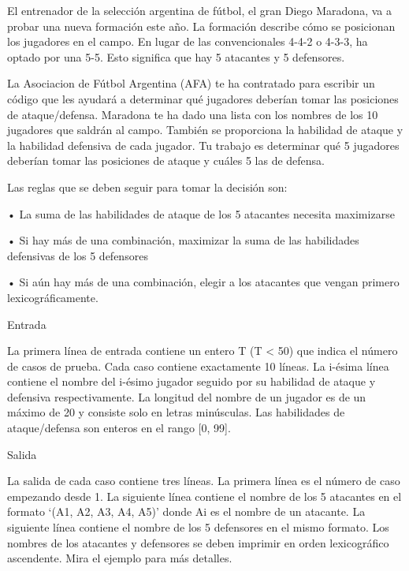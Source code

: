 El entrenador de la selección argentina de fútbol, el gran Diego Maradona, va a probar una nueva formación este año. La formación describe cómo se posicionan los jugadores en el campo. En lugar de las convencionales 4-4-2 o 4-3-3, ha optado por una 5-5. Esto significa que hay 5 atacantes y 5 defensores. 

La Asociacion de Fútbol Argentina (AFA) te ha contratado para escribir un código que les ayudará a determinar qué jugadores deberían tomar las posiciones de ataque/defensa. Maradona te ha dado una lista con los nombres de los 10 jugadores que saldrán al campo. También se proporciona la habilidad de ataque y la habilidad defensiva de cada jugador. Tu trabajo es determinar qué 5 jugadores deberían tomar las posiciones de ataque y cuáles 5 las de defensa. 

Las reglas que se deben seguir para tomar la decisión son: 

• La suma de las habilidades de ataque de los 5 atacantes necesita maximizarse 

• Si hay más de una combinación, maximizar la suma de las habilidades defensivas de los 5 defensores 

• Si aún hay más de una combinación, elegir a los atacantes que vengan primero lexicográficamente. 

Entrada 

La primera línea de entrada contiene un entero T (T < 50) que indica el número de casos de prueba. Cada caso contiene exactamente 10 líneas. La i-ésima línea contiene el nombre del i-ésimo jugador seguido por su habilidad de ataque y defensiva respectivamente. La longitud del nombre de un jugador es de un máximo de 20 y consiste solo en letras minúsculas. Las habilidades de ataque/defensa son enteros en el rango [0, 99]. 

Salida 

La salida de cada caso contiene tres líneas. La primera línea es el número de caso empezando desde 1. La siguiente línea contiene el nombre de los 5 atacantes en el formato ‘(A1, A2, A3, A4, A5)’ donde Ai es el nombre de un atacante. La siguiente línea contiene el nombre de los 5 defensores en el mismo formato. Los nombres de los atacantes y defensores se deben imprimir en orden lexicográfico ascendente. Mira el ejemplo para más detalles.
